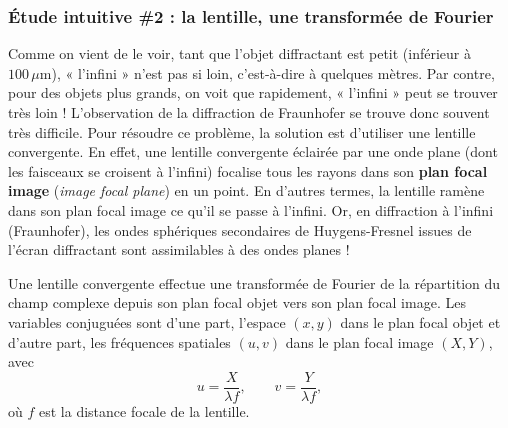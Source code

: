 \subsubsection{Étude intuitive \#2 : la lentille, une transformée de Fourier}
Comme on vient de le voir, tant que l'objet diffractant est petit (inférieur à
$100\,\mu\mathrm{m}$), « l'infini » n'est pas si loin, c'est-à-dire à quelques
mètres. Par contre, pour des objets plus grands, on voit que rapidement,
« l'infini » peut se trouver très loin ! L'observation de la diffraction de
Fraunhofer se trouve donc souvent très difficile. Pour résoudre ce problème, la solution est d'utiliser
une lentille convergente. En effet, une lentille convergente éclairée par une
onde plane (dont les faisceaux se croisent à l'infini) focalise tous les rayons
dans son \textbf{plan focal image} (\textit{image focal plane}) en un point. En
d'autres termes, la lentille ramène dans son plan focal image ce qu'il se passe
à l'infini. Or, en diffraction à l'infini (Fraunhofer), les ondes sphériques
secondaires de Huygens-Fresnel issues de l'écran diffractant sont assimilables à
des ondes planes !

\begin{theorem}
  Une lentille convergente effectue une transformée de Fourier de la répartition
  du champ complexe depuis son plan focal objet vers son plan focal image. Les
  variables conjuguées sont d'une part, l'espace $(x,y)$ dans le plan focal
  objet et d'autre part, les fréquences spatiales $(u,v)$ dans le plan focal
  image $(X,Y)$, avec
  \[
    u = \frac{X}{\lambda f}, \qquad v = \frac{Y}{\lambda f},
  \]
  où $f$ est la distance focale de la lentille.
\end{theorem}


